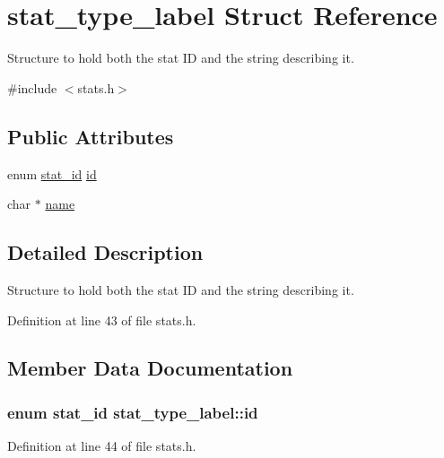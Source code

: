\hypertarget{structstat__type__label}{\section{stat\-\_\-type\-\_\-label Struct Reference}
\label{structstat__type__label}
}


Structure to hold both the stat I\-D and the string describing it.  




{\ttfamily \#include $<$stats.\-h$>$}

\subsection*{Public Attributes}
\begin{DoxyCompactItemize}
\item 
enum \hyperlink{stat__ids_8h_ac210bd14ba53357098c0b3ebdd69784e}{stat\-\_\-id} \hyperlink{structstat__type__label_a0f5647728338f562228eeed8e3c2d2ca}{id}
\item 
char $\ast$ \hyperlink{structstat__type__label_a4dc872fb0d9d5fb81f1931319d4b1eff}{name}
\end{DoxyCompactItemize}


\subsection{Detailed Description}
Structure to hold both the stat I\-D and the string describing it. 

Definition at line 43 of file stats.\-h.



\subsection{Member Data Documentation}
\hypertarget{structstat__type__label_a0f5647728338f562228eeed8e3c2d2ca}{
\subsubsection[{id}]{\setlength{\rightskip}{0pt plus 5cm}enum {\bf stat\-\_\-id} stat\-\_\-type\-\_\-label\-::id}}\label{structstat__type__label_a0f5647728338f562228eeed8e3c2d2ca}


Definition at line 44 of file stats.\-h.

